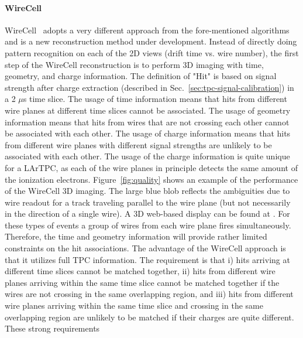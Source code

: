 \paragraph{WireCell}
WireCell~\cite{wire-cell} adopts a very different approach from the 
fore-mentioned algorithms and is a new reconstruction method under development.
Instead of directly doing pattern recognition on each of the 2D views (drift 
time vs. wire number), the first step of the WireCell reconstruction is to 
perform 3D imaging with time, geometry, and charge information. The definition
of "Hit" is based on signal strength after charge extraction (described in 
Sec.~\ref{sec:tpc-signal-calibration}) in a 2 $\mu$s time slice. The usage of 
time information means that hits from different wire planes at different time 
slices cannot be associated. The usage of geometry information means that hits
from wires that are not crossing each other cannot be associated with each other. 
The usage of charge information means that hits from different wire planes
with different signal strengths are unlikely to be associated with each other. The 
usage of the charge information is quite unique for a LArTPC, as each of the 
wire planes in principle detects the same amount of the ionization electrons. 
Figure~\ref{fig:quality} shows an example of the performance of the WireCell 3D imaging. 
The large blue blob reflects the ambiguities due to wire readout for a track
traveling parallel to the wire plane (but not necessarily in the direction of a single wire). A 3D web-based 
display can be found at \cite{ref:wirecell-3D}. 
For these types of events a group of wires from each 
wire plane fires simultaneously. Therefore, the time and geometry 
information will provide rather limited constraints on the hit associations.
The advantage of the WireCell approach is that it utilizes full TPC 
information. The requirement is that i) hits arriving at different time slices cannot be
matched together, ii) hits from different wire planes arriving within the same time slice
cannot be matched together if the wires are not crossing in the same overlapping region, 
and iii) hits from different wire planes arriving within the same time slice and crossing
in the same overlapping region are unlikely to be matched if their charges are quite different. 
These strong requirements 
